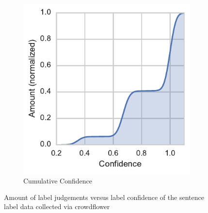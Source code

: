 \begin{figure}[h]
\begin{subfigure}[b]{0.43\textwidth}
        \includegraphics[width=\textwidth]{img/sentence-data-judgement-confidence-cumulative.pdf}
        \caption{Cumulative Confidence}
\label{fig:sentence-data-judgement-confidence-cumulative}
    \end{subfigure}
    \caption{Amount of label judgements versus label confidence of the sentence label data collected via crowdflower}
\label{fig:sentence-data-judgements}
\end{figure}
